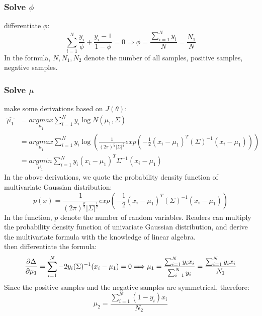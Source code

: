 \documentclass{report}
\begin{document}
\subsubsection{Solve $\phi$}
differentiate $\phi$:
$$
\sum_{i=1}^{N} \frac{y_{i}}{\phi}+\frac{y_{i}-1}{1-\phi}=0
\Longrightarrow \phi=\frac{\sum_{i=1}^{N} y_{i}}{N}=\frac{N_{1}}{N}
$$
In the formula, $N,N_1,N_2$ denote the number of all samples, positive samples, negative samples.
\subsubsection{Solve $\mu$}
make some derivations based on $J(\theta)$:
$$
\begin{aligned} \hat{\mu_{1}} 
&=\underset{\mu_{1}}{argmax} \sum_{i=1}^{N} y_{i} \log N\left(\mu_{1}, \Sigma\right) \\
&=\underset{\mu_1}{argmax} \sum_{i=1}^{N} y_i \log (\frac{1}{(2\pi)^{\frac{p}{2}}|\Sigma|^{\frac{1}{2}}}exp(-\frac{1}{2}(x_i-\mu_1)^T(\Sigma)^{-1}(x_i-\mu_1)))\\
&=\underset{\mu_{1}}{argmin} \sum_{i=1}^{N} y_{i}\left(x_{i}-\mu_{1}\right)^{T} \Sigma^{-1}\left(x_{i}-\mu_{1}\right)
\end{aligned}
$$
In the above derivations, we quote the probability density function of multivariate Gaussian distribution:
$$
p(x)=\frac{1}{(2\pi)^{\frac{p}{2}}|\Sigma|^{\frac{1}{2}}}exp(-\frac{1}{2}(x_i-\mu_1)^T(\Sigma)^{-1}(x_i-\mu_1))
$$
In the function, $p$ denote the number of random variables. Readers can multiply the probability density function of univariate Gaussian distribution, and derive the multivariate formula with the knowledge of linear algebra.\\
then differentiate the formula:
$$
\frac{\partial \Delta}{\partial \mu_1}=\sum_{i=1}^N -2y_i (\Sigma)^{-1}(x_i-\mu_1)=0\\
\Longrightarrow \mu_{1}=\frac{\sum_{i=1}^{N} y_{i} x_{i}}{\sum_{i=1}^{N} y_{i}}=\frac{\sum_{i=1}^{N} y_{i} x_{i}}{N_{1}}
$$
Since the positive samples and the negative samples are symmetrical, therefore:
$$
\mu_{2}=\frac{\sum_{i=1}^{N}\left(1-y_{i}\right) x_{i}}{N_{2}}
$$
\end{document}
